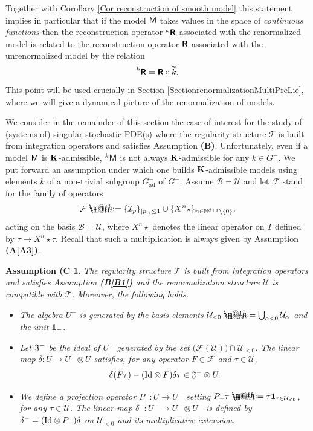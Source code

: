 \documentclass[10pt, reqno]{amsart}
\makeatletter
\numberwithin{subsection}{section}
\numberwithin{subsubsection}{subsection}
\numberwithin{equation}{section} %
\theoremstyle{mystyle}
\theoremstyle{mystyle2}
\theoremstyle{mystyle3}
\newtheorem{assumC}{Assumption (C}
\newcommand{\refA}[1]{\textbf{\textsf{(A\ref{#1})}}}
\newcommand{\refB}[1]{\textbf{\textsf{(B\ref{#1})}}}
\newcommand{\REFB}{\textbf{\textsf{(B)}}}
\newcommand{\mcF}{\boldsymbol{p}}
\newcommand\bbN{\mathbb{N}}
\newcommand{\mcB}{\mathcal{B}}
\renewcommand{\mcF}{\mathcal{F}}
\newcommand{\mcI}{\mathcal{I}}
\newcommand\mcU{\mathcal U}
\newcommand*{\defeq}{\mathrel{\rlap{%
                     \raisebox{0.3ex}{$\m@th\cdot$}}%
                     \raisebox{-0.3ex}{$\m@th\cdot$}}%
                     =}
\makeatother
\begin{document}
\medskip

Together with Corollary \ref{Cor reconstruction of smooth model} this statement implies in particular that if the model $\sf M$ takes values in the space of {\it continuous functions} then the reconstruction operator $^{k}\textbf{\textsf{R}}$ associated with the renormalized model is related 
to the reconstruction operator $\textbf{\textsf{R}}$ associated with the unrenormalized model by the relation 
$$
^{k}\textbf{\textsf{R}} = \textbf{\textsf{R}}\circ\widetilde{k}.
$$
This point will be used crucially in Section \ref{SectionrenormalizationMultiPreLie}, where we will give a dynamical picture of the renormalization of models.   

\medskip

We consider in the remainder of this section the case of interest for the 
study of (systems of) singular stochastic PDE(s) where the regularity structure $\mathscr{T}$ is built from integration operators and satisfies Assumption \REFB. Unfortunately, even if a model $\sf M$ is ${\bf K}$-admissible, ${}^k{\sf M}$ is not always ${\bf K}$-admissible for any $k\in G^-$. We put forward an assumption under which one builds ${\bf K}$-admissible models using elements $k$ of a non-trivial subgroup $G_\textrm{ad}^-$ of $G^-$. Assume $\mcB=\mcU$ and let $\mcF$ stand for the family of operators
$$
\mcF \defeq  \{\mcI_p\}_{|p|_{\frak{s}}\le1}\cup\{X^n\star\}_{n\in\bbN^{d+1}\setminus\{0\}}, 
$$
acting on the basis $\mcB=\mcU$, where $X^n\star$ denotes the linear operator on $T$ defined by $\tau\mapsto X^n\star\tau$. Recall that such a multiplication is always given by Assumption \refA{A3}. 

\medskip

\begin{assumC}\label{C1}
The regularity structure $\mathscr{T}$ is built from integration operators and satisfies Assumption \refB{B1} and the renormalization structure $\mathscr{U}$ is compatible with $\mathscr{T}$. Moreover, the following holds.
\begin{itemize}
\setlength{\itemsep}{0.1cm}
	\item The algebra $U^-$ is generated by the basis elements $\mcU_{<0}\defeq \bigcup_{\alpha<0}\mcU_\alpha$ and the unit $\textbf{\textsf{1}}_-$.   
	\item 
	Let $\frak{J}^-$ be the ideal of $U^-$ generated by the set $\big(\mcF(\mcU)\big)\cap\mcU_{<0}$. The linear map $\delta:U\to U^-\otimes U$ satisfies, for any operator $F\in\mcF$ and $\tau\in\mcU$,
	\begin{align}\label{eq relation delta and K}
	\delta(F\tau)-(\text{\rm Id}\otimes F)\delta\tau\in \frak{J}^-\otimes U.
	\end{align}
	
	\item 
	We define a projection operator $P_-:U\to U^-$ setting $P_-\tau \defeq  \tau{\bf1}_{\tau\in\mcU_{<0}}$, for any $\tau\in\mcU$. The linear map $\delta^-:U^-\to U^-\otimes U^-$ is defined by $\delta^- = (\text{\rm Id}\otimes P_-)\delta$ on $\mcU_{<0}$ and its multiplicative extension.
\end{itemize}
\end{assumC}      
\end{document}
